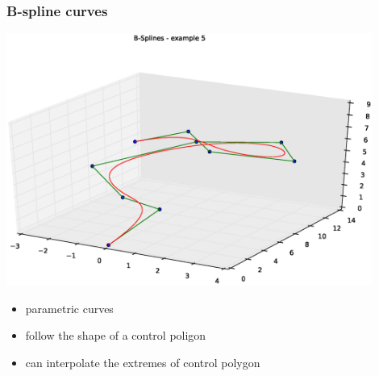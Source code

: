 \begin{frame}
  \frametitle{B-spline curves}
  \begin{center}
    \includegraphics[width=0.9\textwidth, trim=110 30 50 50, clip]{img/bspline.eps}
  \end{center}
  \pause
  \begin{itemize}
  \item \alert{parametric} curves\pause
  \item follow the shape of a \alert{control poligon}\pause
  \item can interpolate the
    \alert{extremes} of control polygon
  \end{itemize}
\end{frame}

